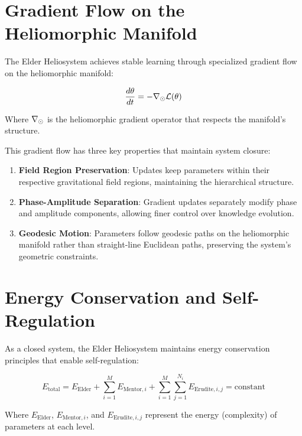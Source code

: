 \section{Gradient Flow on the Heliomorphic Manifold}

The Elder Heliosystem achieves stable learning through specialized gradient flow on the heliomorphic manifold:

\begin{equation}
\frac{d\theta}{dt} = -\nabla_{\odot} \mathcal{L}(\theta)
\end{equation}

Where $\nabla_{\odot}$ is the heliomorphic gradient operator that respects the manifold's structure.

This gradient flow has three key properties that maintain system closure:

\begin{enumerate}
    \item \textbf{Field Region Preservation}: Updates keep parameters within their respective gravitational field regions, maintaining the hierarchical structure.
    
    \item \textbf{Phase-Amplitude Separation}: Gradient updates separately modify phase and amplitude components, allowing finer control over knowledge evolution.
    
    \item \textbf{Geodesic Motion}: Parameters follow geodesic paths on the heliomorphic manifold rather than straight-line Euclidean paths, preserving the system's geometric constraints.
\end{enumerate}

\section{Energy Conservation and Self-Regulation}

As a closed system, the Elder Heliosystem maintains energy conservation principles that enable self-regulation:

\begin{equation}
E_{\text{total}} = E_{\text{Elder}} + \sum_{i=1}^M E_{\text{Mentor},i} + \sum_{i=1}^M \sum_{j=1}^{N_i} E_{\text{Erudite},i,j} = \text{constant}
\end{equation}

Where $E_{\text{Elder}}$, $E_{\text{Mentor},i}$, and $E_{\text{Erudite},i,j}$ represent the energy (complexity) of parameters at each level.

